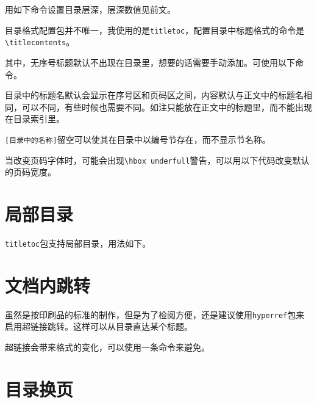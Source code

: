 \documentclass[10pt,openany]{book}
\begin{document}
\begin{sloppypar}
用如下命令设置目录层深，层深数值见前文。



目录格式配置包并不唯一，我使用的是\texttt{titletoc}，配置目录中标题格式的命令是\texttt{\textbackslash{}titlecontents}。



其中，无序号标题默认不出现在目录里，想要的话需要手动添加。可使用以下命令。



目录中的标题名默认会显示在序号区和页码区之间，内容默认与正文中的标题名相同，可以不同，有些时候也需要不同。如注只能放在正文中的标题里，而不能出现在目录索引里。



\texttt{{[}目录中的名称{]}}留空可以使其在目录中以编号节存在，而不显示节名称。

当改变页码字体时，可能会出现\texttt{\textbackslash{}hbox\ underfull}警告，可以用以下代码改变默认的页码宽度。



\section{局部目录}

\texttt{titletoc}包支持局部目录，用法如下。



\section{文档内跳转}

虽然是按印刷品的标准的制作，但是为了检阅方便，还是建议使用\texttt{hyperref}包来启用超链接跳转。这样可以从目录直达某个标题。

超链接会带来格式的变化，可以使用一条命令来避免。



\section{目录换页}


\end{sloppypar}
\end{document}
